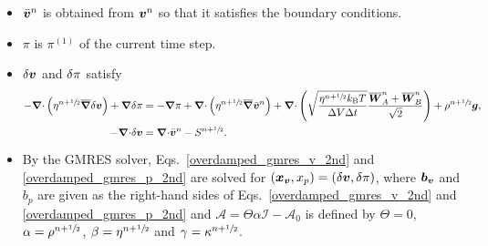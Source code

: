 \documentclass[
10pt
showpacs, showkeys,
amsmath,amssymb,
aps,
pre,
floatfix,
]{revtex4-1}
\newcommand{\divg}{{\V\nabla\cdot}}                       %
\newcommand{\paren}[1]{{(#1)}}                            %
\begin{document}
\begin{enumerate}
\begin{itemize}
\item $\bar{\boldsymbol{v}}^n$ is obtained from $\boldsymbol{v}^n$ so that it satisfies the boundary conditions.
\item $\pi$ is $\pi^\paren{1}$ of the current time step.
\item $\delta\boldsymbol{v}$ and $\delta\pi$ satisfy
\begin{align}
\label{overdamped_gmres_v_2nd}
-\divg\left(\eta^{n+\myhalf}\overline{\grad}\d{\V{v}}\right) + \grad\d{\pi}
& = -\grad\pi +\divg\left( \eta^{n+\myhalf} \overline{\grad}\bar{\V{v}}^n \right)
+ \divg\left( \sqrt{\frac{\eta^{n+\myhalf} k_\mathrm{B}T}{\D{V}\D{t}} } \frac{\overline{\V{W}}^n_A + \overline{\V{W}}^n_B}{\sqrt{2}} \right) + \rho^{n+\myhalf}\V{g}, \\
\label{overdamped_gmres_p_2nd}
-\divg\d{\V{v}} & = \divg\bar{\V{v}}^n-S^{n+\myhalf}.
\end{align}
\item By the GMRES solver, Eqs.~\eqref{overdamped_gmres_v_2nd} and \eqref{overdamped_gmres_p_2nd} are solved for $(\boldsymbol{x}_{\boldsymbol{v}},x_p)=(\delta\boldsymbol{v},\delta\pi)$, where $\boldsymbol{b}_{\boldsymbol{v}}$ and $b_p$ are given as the right-hand sides of Eqs.~\eqref{overdamped_gmres_v_2nd} and \eqref{overdamped_gmres_p_2nd} and $\mathcal{A}=\Theta\alpha\mathcal{I}-\mathcal{A}_0$ is defined by $\Theta=0$, $\alpha=\rho^{n+\sfrac{1}{2}}$, $\beta=\eta^{n+\sfrac{1}{2}}$ and $\gamma=\kappa^{n+\sfrac{1}{2}}$.
\end{itemize}

\end{enumerate}
\end{document}
